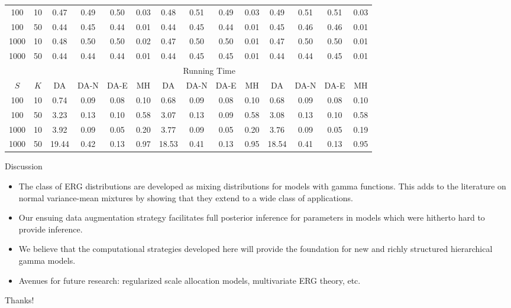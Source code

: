 \documentclass[10pt]{beamer}
\theoremstyle{remark}
\theoremstyle{definition}
\begin{document}
\begin{frame}
\begin{table}[h!]
{\begin{tabular}{@{}cc|cccc|cccc|cccc@{}}
		100           & 10 & 0.47   & 0.49  & 0.50  & 0.03   & 0.48  & 0.51  & 0.49  & 0.03   & 0.49  & 0.51  & 0.51  & 0.03   \\
		100           & 50 & 0.44   & 0.45  & 0.44  & 0.01   & 0.44  & 0.45  & 0.44  & 0.01   & 0.45  & 0.46  & 0.46  & 0.01   \\
		1000          & 10 & 0.48   & 0.50  & 0.50  & 0.02   & 0.47  & 0.50  & 0.50  & 0.01   & 0.47  & 0.50  & 0.50  & 0.01   \\
		1000          & 50 & 0.44   & 0.44  & 0.44  & 0.01   & 0.44  & 0.45  & 0.45  & 0.01   & 0.44  & 0.44  & 0.45  & 0.01   \\ \midrule
		&    & \multicolumn{12}{c}{Running Time}                                                                     \\ \midrule
		$S$    & $K$  & DA    & DA-N  & DA-E  & MH    & DA    & DA-N  & DA-E  & MH    & DA    & DA-N  & DA-E  & MH    \\ \midrule
		100           & 10 & 0.74   & 0.09  & 0.08  & 0.10   & 0.68  & 0.09  & 0.08  & 0.10   & 0.68  & 0.09  & 0.08  & 0.10   \\
		100           & 50 & 3.23   & 0.13  & 0.10  & 0.58   & 3.07  & 0.13  & 0.09  & 0.58   & 3.08  & 0.13  & 0.10  & 0.58   \\
		1000          & 10 & 3.92   & 0.09  & 0.05  & 0.20   & 3.77  & 0.09  & 0.05  & 0.20   & 3.76  & 0.09  & 0.05  & 0.19   \\
		1000          & 50 & 19.44  & 0.42  & 0.13  & 0.97   & 18.53 & 0.41  & 0.13  & 0.95   & 18.54 & 0.41  & 0.13  & 0.95  \\ \bottomrule
	\end{tabular}}
\end{table}
\end{frame}

\begin{frame}{Discussion}
\begin{itemize}
	\item The class of ERG distributions are developed as mixing distributions for models with gamma functions. 
	This adds to the literature on normal variance-mean mixtures by showing that they extend to a wide class of applications. 
	\item Our ensuing data augmentation strategy facilitates full posterior inference for parameters in models which were hitherto hard to provide inference.
	\item We believe that the computational strategies developed here will provide the foundation for new and richly structured hierarchical gamma models. 
	\item Avenues for future research: regularized scale allocation models, multivariate ERG theory, etc.
\end{itemize}
\end{frame}

\begin{frame}
\Huge
\centering
Thanks!
\end{frame}
\end{document}
